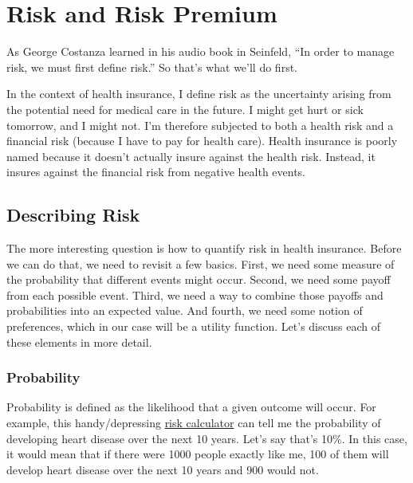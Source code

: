 \documentclass[
  letterpaper,
  DIV=11,
  numbers=noendperiod]{scrreport}
\theoremstyle{definition}
\theoremstyle{remark}
\begin{document}
\hypertarget{risk-and-risk-premium}{%
\chapter{Risk and Risk Premium}\label{risk-and-risk-premium}}

As George Costanza learned in his audio book in Seinfeld, ``In order to
manage risk, we must first define risk.'' So that's what we'll do first.

In the context of health insurance, I define risk as the uncertainty
arising from the potential need for medical care in the future. I might
get hurt or sick tomorrow, and I might not. I'm therefore subjected to
both a health risk and a financial risk (because I have to pay for
health care). Health insurance is poorly named because it doesn't
actually insure against the health risk. Instead, it insures against the
financial risk from negative health events.

\hypertarget{sec-riskpremium}{%
\section{Describing Risk}\label{sec-riskpremium}}

The more interesting question is how to quantify risk in health
insurance. Before we can do that, we need to revisit a few basics.
First, we need some measure of the probability that different events
might occur. Second, we need some payoff from each possible event.
Third, we need a way to combine those payoffs and probabilities into an
expected value. And fourth, we need some notion of preferences, which in
our case will be a utility function. Let's discuss each of these
elements in more detail.

\hypertarget{probability}{%
\subsection*{Probability}\label{probability}}

Probability is defined as the likelihood that a given outcome will
occur. For example, this handy/depressing
\href{https://tools.acc.org/ascvd-risk-estimator-plus/\#!/calculate/estimate/}{risk
calculator} can tell me the probability of developing heart disease over
the next 10 years. Let's say that's 10\%. In this case, it would mean
that if there were 1000 people exactly like me, 100 of them will develop
heart disease over the next 10 years and 900 would not.
\end{document}
